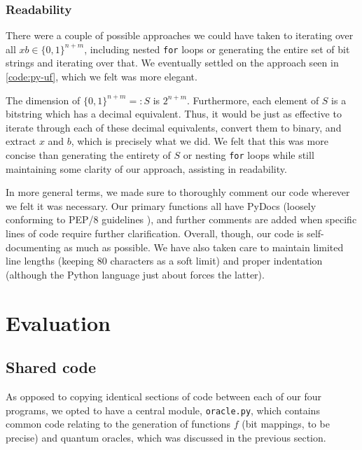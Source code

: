 \documentclass[12pt]{article}
\begin{document}


\subsubsection{Readability}

There were a couple of possible approaches we could have taken to iterating over all $xb \in \{0,1\}^{n+m}$, including nested \texttt{for} loops or generating the entire set of bit strings and iterating over that.
We eventually settled on the approach seen in \autoref{code:py-uf}, which we felt was more elegant.

The dimension of $\{0,1\}^{n+m} =: S$ is $2^{n+m}$.
Furthermore, each element of $S$ is a bitstring which has a decimal equivalent.
Thus, it would be just as effective to iterate through each of these decimal equivalents, convert them to binary, and extract $x$ and $b$, which is precisely what we did.
We felt that this was more concise than generating the entirety of $S$ or nesting \texttt{for} loops while still maintaining some clarity of our approach, assisting in readability.

In more general terms, we made sure to thoroughly comment our code wherever we felt it was necessary.
Our primary functions all have PyDocs (loosely conforming to PEP/8 guidelines \cite{pep8}), and further comments are added when specific lines of code require further clarification.
Overall, though, our code is self-documenting as much as possible.
We have also taken care to maintain limited line lengths (keeping 80 characters as a soft limit) and proper indentation (although the Python language just about forces the latter).

\section{Evaluation}

\subsection{Shared code}
As opposed to copying identical sections of code between each of our four programs, we opted to have a central module, \texttt{oracle.py}, which contains common code relating to the generation of functions $f$ (bit mappings, to be precise) and quantum oracles, which was discussed in the previous section.
\end{document}
